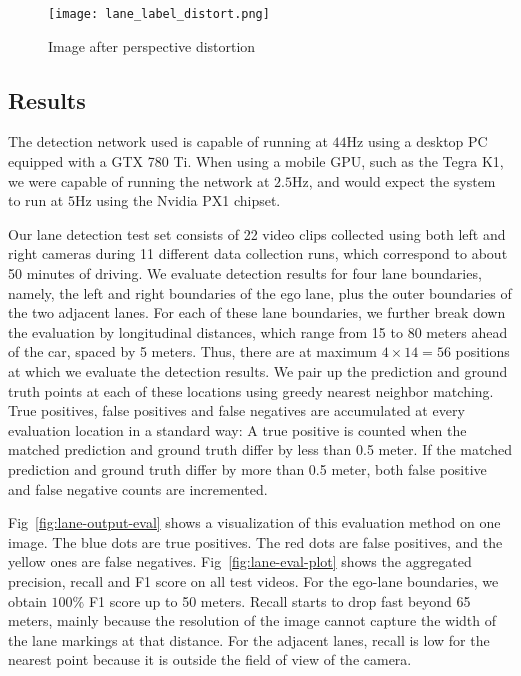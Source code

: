 \documentclass[journal]{IEEEtran}
\begin{document}
\begin{figure}[tb]
  \centering
    \texttt{[image: lane\_label\_distort.png]}
 \caption{Image after perspective distortion}
 \label{fig:lane-gt-distort}
\end{figure}


\subsection{Results}
The detection network used is capable of running at $44$Hz using a desktop PC equipped with a GTX 780 Ti. When using a mobile GPU, such as the Tegra K1, we were capable of running the network at $2.5$Hz, and would expect the system to run at $5$Hz using the Nvidia PX1 chipset.

Our lane detection test set consists of 22 video clips collected using both left and right cameras during 11 different data collection runs, which correspond to about 50 minutes of driving. We evaluate detection results for four lane boundaries, namely, the left and right boundaries of the ego lane, plus the outer boundaries of the two adjacent lanes. For each of these lane boundaries, we further break down the evaluation by longitudinal distances, which range from 15 to 80 meters ahead of the car, spaced by 5 meters. Thus, there are at maximum $4\times14=56$ positions at which we evaluate the detection results. We pair up the prediction and ground truth points at each of these locations using greedy nearest neighbor matching. True positives, false positives and false negatives are accumulated at every evaluation location in a standard way: A true positive is counted when the matched prediction and ground truth differ by less than 0.5 meter. If the matched prediction and ground truth differ by more than 0.5 meter, both false positive and false negative counts are incremented.

Fig~\ref{fig:lane-output-eval} shows a visualization of this evaluation method on one image. The blue dots are true positives. The red dots are false positives, and the yellow ones are false negatives. Fig~\ref{fig:lane-eval-plot} shows the aggregated precision, recall and F1 score on all test videos. For the ego-lane boundaries, we obtain $100\%$ F1 score up to 50 meters. Recall starts to drop fast beyond 65 meters, mainly because the resolution of the image cannot capture the width of the lane markings at that distance. For the adjacent lanes, recall is low for the nearest point because it is outside the field of view of the camera.
\end{document}
